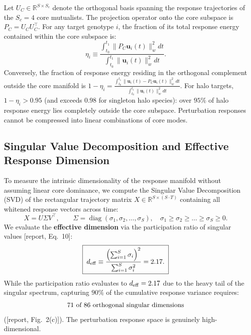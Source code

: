 \documentclass[11pt,a4paper]{article}
\newcommand{\R}[1]{\textcolor{blue!55!black}{[report, #1]}}
\begin{document}
Let $U_C \in \mathbb{R}^{S \times S_c}$ denote the orthogonal basis spanning the response trajectories of the $S_c = 4$ core mutualists. The projection operator onto the core subspace is $P_C = U_C U_C^\top$. For any target genotype $i$, the fraction of its total response energy contained within the core subspace is:
\begin{equation}
\eta_i \equiv \frac{\int_{t_0}^{t_1} \|P_C \mathbf{u}_i(t)\|_w^2 dt}{\int_{t_0}^{t_1} \|\mathbf{u}_i(t)\|_w^2 dt}.
\label{eq:eta_subspace_def}
\end{equation}
Conversely, the fraction of response energy residing in the orthogonal complement outside the core manifold is $1 - \eta_i = \frac{\int_{t_0}^{t_1} \|\mathbf{u}_i(t) - P_C \mathbf{u}_i(t)\|_w^2 dt}{\int_{t_0}^{t_1} \|\mathbf{u}_i(t)\|_w^2 dt}$. For halo targets, $1 - \eta_i > 0.95$ (and exceeds $0.98$ for singleton halo species): over $95\%$ of halo response energy lies completely outside the core subspace. Perturbation responses cannot be compressed into linear combinations of core modes.

\subsection{Singular Value Decomposition and Effective Response Dimension}

To measure the intrinsic dimensionality of the response manifold without assuming linear core dominance, we compute the Singular Value Decomposition (SVD) of the rectangular trajectory matrix $X \in \mathbb{R}^{S \times (S \cdot T)}$ containing all whitened response vectors across time:
\begin{equation}
X = U \Sigma V^\top, \qquad \Sigma = \operatorname{diag}(\sigma_1, \sigma_2, \dots, \sigma_S), \quad \sigma_1 \ge \sigma_2 \ge \dots \ge \sigma_S \ge 0.
\end{equation}
We evaluate the \textbf{effective dimension} via the participation ratio of singular values \R{Eq.~10}:
\begin{equation}
\boxed{\;d_{\mathrm{eff}} \equiv \frac{\left( \sum_{i=1}^S \sigma_i \right)^2}{\sum_{i=1}^S \sigma_i^2} = 2.17.\;}
\label{eq:deff_supp2}
\end{equation}
While the participation ratio evaluates to $d_{\mathrm{eff}} = 2.17$ due to the heavy tail of the singular spectrum, capturing $90\%$ of the cumulative response variance requires:
\begin{equation}
71 \text{ of } 86 \text{ orthogonal singular dimensions}
\end{equation}
(\R{Fig.~2(c)}). The perturbation response space is genuinely high-dimensional.
\end{document}

